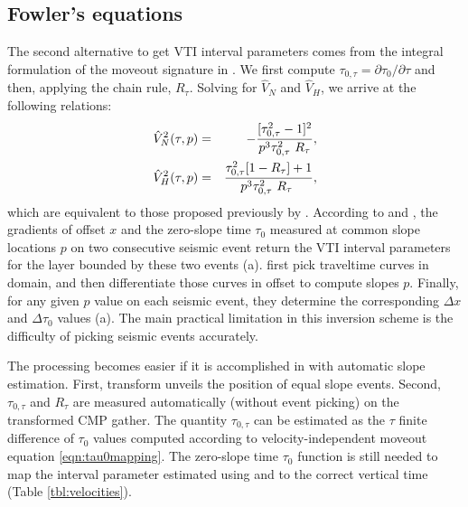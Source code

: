 \subsection{Fowler's equations}

The second alternative to get VTI interval parameters comes from
the integral formulation of the \taup moveout signature in
.  We first compute
\mbox{$\tau_{0,\tau}=\partial\tau_{0}/\partial\tau$}  and
then, applying the chain rule, $R_{\tau}$. Solving for $\hat{V}_{N}$
and $\hat{V}_{H}$, we arrive at the following relations:
\begin{eqnarray}
\hat{V}_{N}^{2}(\tau,p) &=&-\frac{[ \tau_{0,\tau}^{2}-1]^{2}}{%
p^{3}\tau_{0,\tau}^{2}~R_{\tau} }, \label{eqn:fowler1} \\ 
\hat{V}_{H}^{2}(\tau,p) &=& \frac{\tau_{0,\tau}^{2}[1-R_{\tau}]+1}{p^{3}\tau_{0,\tau}^{2}~R_{\tau}~},
\label{eqn:fowler2}
\end{eqnarray}
which are equivalent to those proposed previously by
\cite{fowler:3028}. According to  and , the
gradients of offset $x$ and the zero-slope time $\tau_0$ measured at
common slope locations $p$ on two consecutive seismic event return
the VTI interval parameters for the layer bounded by these two events
(a). \cite{fowler:3028} first pick traveltime curves in
\tx domain, and then differentiate those curves in offset to compute
slopes $p$. Finally, for any given $p$ value on each seismic event,
they determine the corresponding $\Delta x$ and $\Delta \tau_0$ values
(a). The main practical limitation in this
inversion scheme is the difficulty of picking seismic events
accurately.

The processing becomes easier if it is accomplished in \taup with
automatic slope estimation. First, \mbox{\taup} transform unveils the
position of equal slope events.  Second, $\tau_{0,\tau}$ and
$R_{\tau}$ are measured automatically (without event picking) on the
\taup transformed CMP gather. The quantity $\tau_{0,\tau}$ can be
estimated as the $\tau$ finite difference of $\tau _{0}$ values
computed according to velocity-independent moveout equation
\ref{eqn:tau0mapping}. The zero-slope time $\tau_0$ function is still
needed to map the interval parameter estimated using 
and  to the correct vertical time (Table
\ref{tbl:velocities}).







